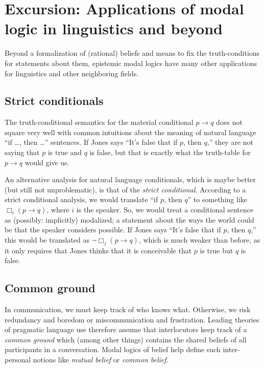 \documentclass[nobib,nofonts]{tufte-handout}
\begin{document}
\section{Excursion: Applications of modal logic in linguistics and beyond}

Beyond a formalization of (rational) beliefs and means to fix the truth-conditions for statements about them, epistemic modal logics have many other applications for linguistics and other neighboring fields.

\subsection{Strict conditionals}

The truth-conditional semantics for the material conditional $p \rightarrow q$ does not square very well with common intuitions about the meaning of natural language ``if \dots, then \dots'' sentences.
If Jones says ``It's false that if $p$, then $q$,'' they are not saying that $p$ is true and $q$ is false, but that is exactly what the truth-table for $p \rightarrow q$ would give us.

An alternative analysis for natural language conditionals, which is maybe better (but still not unproblematic), is that of the \emph{strict conditional}.
According to a strict conditional analysis, we would translate ``if $p$, then $q$'' to something like $\Box_{i}(p \rightarrow q)$, where $i$ is the speaker.
So, we would treat a conditional sentence as (possibly: implicitly) modalized; a statement about the ways the world could be that the speaker considers possible.
If Jones says ``It's false that if $p$, then $q$,'' this would be translated as $\neg \Box_{j}(p \rightarrow q)$, which is much weaker than before, as it only requires that Jones thinks that it is conceivable that $p$ is true but $q$ is false.

\subsection{Common ground}

In communication, we must keep track of who knows what.
Otherwise, we risk redundancy and boredom or miscommunication and frustration.
Leading theories of pragmatic language use therefore assume that interlocutors keep track of a \emph{common ground} which (among other things) contains the shared beliefs of all participants in a conversation.
Modal logics of belief help define such inter-personal notions like \emph{mutual belief} or \emph{common belief}.
\end{document}
